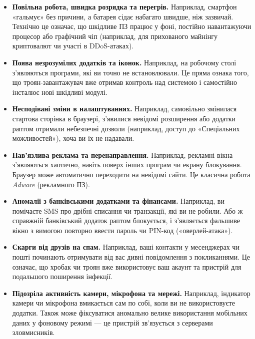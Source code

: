 \begin{itemize}
    \item \textbf{Повільна робота, швидка розрядка та перегрів.}
    Наприклад, смартфон «гальмує» без причини, а батарея сідає набагато швидше, ніж зазвичай. Технічно це означає, що шкідливе ПЗ працює у фоні, постійно навантажуючи процесор або графічний чіп (наприклад, для прихованого майнінгу криптовалют чи участі в DDoS-атаках).

    \item \textbf{Поява незрозумілих додатків та іконок.}
    Наприклад, на робочому столі з’являються програми, які ви точно не встановлювали. Це пряма ознака того, що троян-завантажувач вже отримав контроль над системою і самостійно інсталює нові шкідливі модулі.

    \item \textbf{Несподівані зміни в налаштуваннях.}
    Наприклад, самовільно змінилася стартова сторінка в браузері, з'явилися невідомі розширення або додатки раптом отримали небезпечні дозволи (наприклад, доступ до «Спеціальних можливостей»), хоча ви їх не надавали.

    \item \textbf{Нав'язлива реклама та перенаправлення.}
    Наприклад, рекламні вікна з’являються хаотично, навіть поверх інших програм чи екрану блокування. Браузер може автоматично переходити на невідомі сайти. Це класична робота \textit{Adware} (рекламного ПЗ).

    \item \textbf{Аномалії з банківськими додатками та фінансами.}
    Наприклад, ви помічаєте SMS про дрібні списання чи транзакції, які ви не робили. Або ж справжній банківський додаток раптом блокується, і з'являється фальшиве вікно з вимогою повторно ввести пароль чи PIN-код («оверлей-атака»).

    \newpage

    \item \textbf{Скарги від друзів на спам.}
    Наприклад, ваші контакти у месенджерах чи пошті починають отримувати від вас дивні повідомлення з покликаннями. Це означає, що хробак чи троян вже використовує ваш акаунт та пристрій для подальшого поширення інфекції.

    \item \textbf{Підозріла активність камери, мікрофона та мережі.}
    Наприклад, індикатор камери чи мікрофона вмикається сам по собі, коли ви не використовуєте додатки. Також може фіксуватися аномально велике використання мобільних даних у фоновому режимі — це пристрій зв'язується з серверами зловмисників.
\end{itemize}

